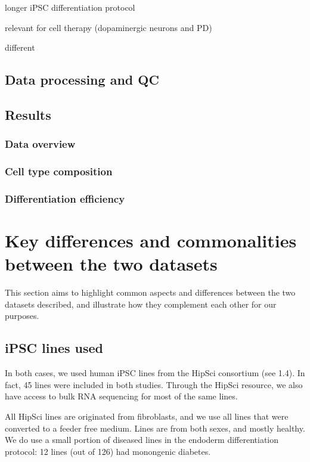 longer iPSC differentiation protocol

relevant for cell therapy (dopaminergic neurons and PD)

different 

\subsection{Data processing and QC}

\subsection{Results}

\subsubsection{Data overview}

\subsubsection{Cell type composition}

\subsubsection{Differentiation efficiency}


\section{Key differences and commonalities between the two datasets}

This section aims to highlight common aspects and differences between the two datasets described, and illustrate how they complement each other for our purposes.

\subsection{iPSC lines used}
In both cases, we used human iPSC lines from the HipSci consortium (see 1.4). 
In fact, 45 lines were included in both studies.
Through the HipSci resource, we also have access to bulk RNA sequencing for most of the same lines.


All HipSci lines are originated from fibroblasts, and we use all lines that were converted to a feeder free medium.
Lines are from both sexes, and mostly healthy. We do use a small portion of diseased lines in the endoderm differentiation protocol: 12 lines (out of 126) had monongenic diabetes. 


